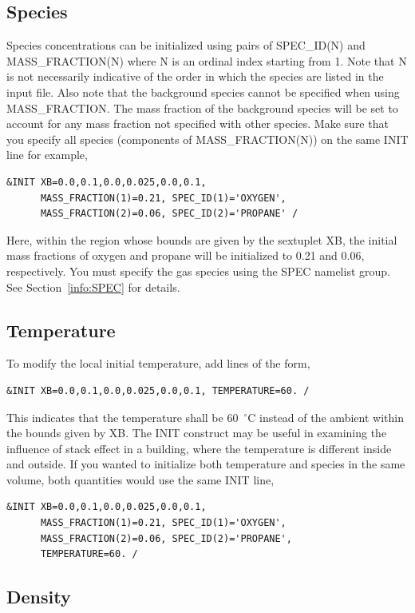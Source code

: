 \documentclass[11pt]{book}
\begin{document}
\subsection*{Species}

Species concentrations can be initialized using pairs of {\ct SPEC\_ID(N)} and {\ct MASS\_FRACTION(N)} where {\ct N} is an ordinal index starting from 1. Note that {\ct N} is not necessarily indicative of the order in which the species are listed in the input file. Also note that the background species cannot be specified when using {\ct MASS\_FRACTION}.  The mass fraction of the background species will be set to account for any mass fraction not specified with other species.
Make sure that you specify all species (components of {\ct MASS\_FRACTION(N)}) on the same {\ct INIT} line for example,
\begin{lstlisting}
&INIT XB=0.0,0.1,0.0,0.025,0.0,0.1,
      MASS_FRACTION(1)=0.21, SPEC_ID(1)='OXYGEN',
      MASS_FRACTION(2)=0.06, SPEC_ID(2)='PROPANE' /
\end{lstlisting}
Here, within the region whose bounds are given by the sextuplet {\ct XB}, the initial mass fractions of oxygen and propane will be initialized to 0.21 and 0.06, respectively. You must specify the gas species using the {\ct SPEC} namelist group. See Section~\ref{info:SPEC} for details.

\subsection*{Temperature}

To modify the local initial temperature, add lines of the form,
\begin{lstlisting}
&INIT XB=0.0,0.1,0.0,0.025,0.0,0.1, TEMPERATURE=60. /
\end{lstlisting}
This indicates that the temperature shall be 60~$^\circ$C instead of the ambient within the bounds given by {\ct XB}. The {\ct INIT} construct may be useful in examining the influence of stack effect in a building, where the temperature is different inside and outside. If you wanted to initialize both temperature and species in the same volume, both quantities would use the same {\ct INIT} line,
\begin{lstlisting}
&INIT XB=0.0,0.1,0.0,0.025,0.0,0.1,
      MASS_FRACTION(1)=0.21, SPEC_ID(1)='OXYGEN',
      MASS_FRACTION(2)=0.06, SPEC_ID(2)='PROPANE',
      TEMPERATURE=60. /
\end{lstlisting}

\subsection*{Density}
\end{document}
